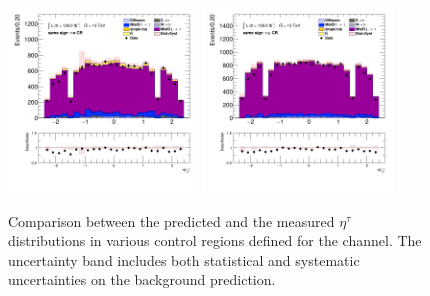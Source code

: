 \begin{figure}[!htp]
\begin{center}
			\includegraphics[width=0.45\textwidth]{chapters/chapter6_HPlus/images/taulep/tau_0_eta_SS_TAUEL.png} 
			\includegraphics[width=0.45\textwidth]{chapters/chapter6_HPlus/images/taulep/tau_0_eta_SS_TAUMU.png} \\
			\end{center}
			\caption{
			Comparison between the predicted and the measured $\eta^{\tau}$ distributions in various control regions defined for the \taulep channel. The uncertainty band includes both statistical and systematic uncertainties on the background prediction. 
			}
			\label{fig:bkg-eta-tau-taulep}
		\end{figure}

